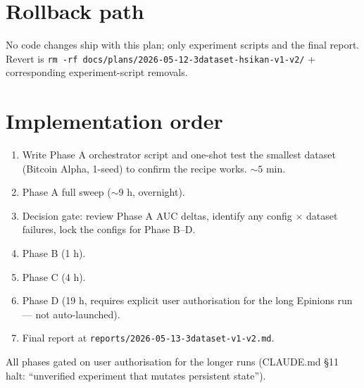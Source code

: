 \documentclass[11pt,a4paper]{article}
\begin{document}
\section{Rollback path}
No code changes ship with this plan; only experiment scripts and
the final report.  Revert is \texttt{rm -rf
docs/plans/2026-05-12-3dataset-hsikan-v1-v2/}
+ corresponding experiment-script removals.

\section{Implementation order}
\begin{enumerate}
\item Write Phase A orchestrator script and one-shot test the
  smallest dataset (Bitcoin Alpha, 1-seed) to confirm the recipe
  works.  $\sim 5$ min.
\item Phase A full sweep ($\sim$9 h, overnight).
\item Decision gate: review Phase A AUC deltas, identify any
  config $\times$ dataset failures, lock the configs for Phase B--D.
\item Phase B (1 h).
\item Phase C (4 h).
\item Phase D (19 h, requires explicit user authorisation for
  the long Epinions run --- not auto-launched).
\item Final report at \texttt{reports/2026-05-13-3dataset-v1-v2.md}.
\end{enumerate}

All phases gated on user authorisation for the longer runs (CLAUDE.md
\S11 halt: ``unverified experiment that mutates persistent state'').
\end{document}
